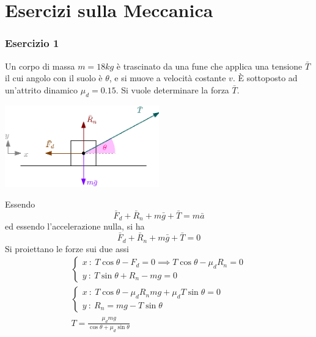 \documentclass[10pt, letterpaper]{report}
\begin{document}
\section{Esercizi sulla Meccanica}
\subsubsection{Esercizio 1}
Un corpo di massa $m=18kg$ è trascinato da una fune che applica una tensione $\bar T$ il cui angolo 
con il suolo è $\theta$, e si muove a velocità costante $v$. È sottoposto ad un'attrito dinamico $\mu_d=0.15$. Si vuole determinare la forza $\bar T$.
\begin{center}
    \includegraphics[width=0.5\textwidth ]{images/esFune.eps}
\end{center}
Essendo 
$$ \bar F_d+\bar R_n+m\bar g+\bar T=m\bar a$$
ed essendo l'accelerazione nulla, si ha 
$$ \bar F_d+\bar R_n+m\bar g+\bar T=0$$
Si proiettano le forze sui due assi 
\begin{eqnarray}
    \begin{cases}
        x\ :  \   T\cos\theta-F_d = 0 \implies   T\cos\theta-\mu_dR_n  =0        \\ 
        y\ :  \   T\sin\theta + R_n-mg = 0
    \end{cases}\\ 
    \begin{cases}
        x\ :  \     T\cos\theta-\mu_dR_nmg+\mu_dT\sin\theta  =0        \\ 
        y\ :  \    R_n=mg-T\sin\theta
    \end{cases}\\ 
    T=\frac{\mu_dmg}{\cos\theta+\mu_d\sin\theta}
\end{eqnarray}
\end{document}
